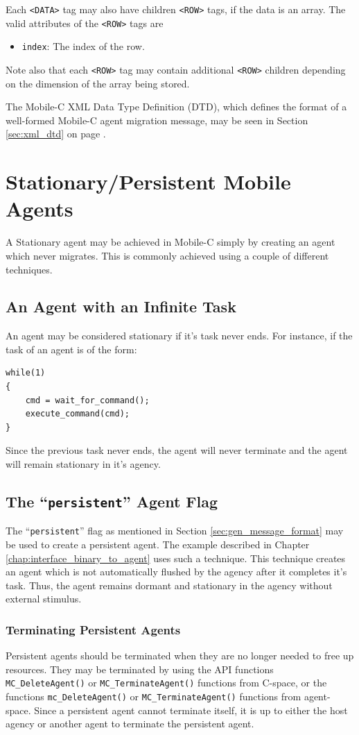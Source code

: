 \documentclass[11pt]{report}
\begin{document}
Each \texttt{<DATA>} tag may also have children \texttt{<ROW>} tags, if
the data is an array. The valid attributes of the \texttt{<ROW>} tags are
\begin{itemize}
\item \texttt{index}: The index of the row.
\end{itemize}
Note also that each \texttt{<ROW>} tag may contain additional \texttt{<ROW>}
children depending on the dimension of the array being stored.

The Mobile-C XML Data Type Definition (DTD), which defines the format of a
well-formed Mobile-C agent migration message, may be seen in Section
\ref{sec:xml_dtd} on page \pageref{sec:xml_dtd}.

\section{Stationary/Persistent Mobile Agents}
A Stationary agent may be achieved in Mobile-C simply by creating an agent which
never migrates. This is commonly achieved using a couple of different
techniques.
\subsection{An Agent with an Infinite Task}
An agent may be considered stationary if it's task never ends. For instance, if
the task of an agent is of the form:
\begin{verbatim}
while(1)
{
    cmd = wait_for_command();
    execute_command(cmd);
}
\end{verbatim}
Since the previous task never ends, the agent will never terminate and the agent
will remain stationary in it's agency. 

\subsection{The ``\texttt{persistent}'' Agent Flag}
The ``\texttt{persistent}'' flag as mentioned in Section
\ref{sec:gen_message_format} may be used to create a persistent agent. The
example described in Chapter \ref{chap:interface_binary_to_agent} uses such a
technique. This technique creates an agent which is not automatically flushed by the agency
after it completes it's task. Thus, the agent remains dormant and stationary in
the agency without external stimulus.

\subsubsection{Terminating Persistent Agents}
Persistent agents should be terminated when they are no longer needed to free
up resources. They may be terminated by using the API functions 
\texttt{MC\_DeleteAgent()} or \texttt{MC\_TerminateAgent()} functions from C-space,
or the functions \texttt{mc\_DeleteAgent()} or \texttt{MC\_TerminateAgent()} functions 
from agent-space. Since a persistent agent cannot terminate itself, it is up to either
the host agency or another agent to terminate the persistent agent.
\end{document}
